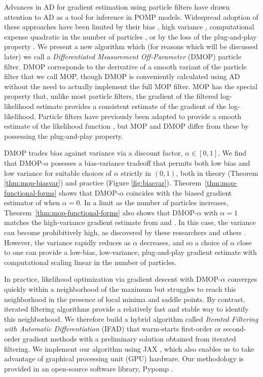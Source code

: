 \documentclass[numsec,webpdf,modern,medium,namedate]{oup-authoring-template}
\begin{document}
Advances in AD for gradient estimation using particle filters \citep{naesseth18, jonschkowski18, corenflos21, scibior21, singh22} have drawn attention to AD as a tool for inference in POMP models.
Widespread adoption of these approaches have been limited by their bias \citep{naesseth18, jonschkowski18}, high variance \citep{poyiadjis11, scibior21}, computational expense quadratic in the number of particles \citep{corenflos21, chen24}, or by the loss of the plug-and-play property \citep{poyiadjis11, scibior21, singh22, chen24}.
We present a new algorithm which (for reasons which will be discussed later) we call a {\it Differentiated Measurement Off-Parameter} (DMOP) particle filter.
DMOP corresponds to the derivative of a smooth variant of the particle filter that we call MOP, though DMOP is conveniently calculated using AD without the need to actually implement the full MOP filter.
MOP has the special property that, unlike most particle filters, the gradient of the filtered log-likelihood estimate provides a consistent estimate of the gradient of the log-likelihood.
Particle filters have previously been adapted to provide a smooth estimate of the likelihood function \citep{svensson18,malik11}, but MOP and DMOP differ from these by possessing the plug-and-play property.

DMOP trades bias against variance via a discount factor, $\alpha \in [0,1]$.
We find that DMOP-$\alpha$ posesses a bias-variance tradeoff that permits both low bias and low variance for suitable choices of $\alpha$ strictly in $(0,1)$, both in theory (Theorem \ref{thm:mop-biasvar}) and practice (Figure \ref{fig:biasvar}).
Theorem~\ref{thm:mop-functional-forms} shows that DMOP-$\alpha$ coincides with the biased gradient estimator of \cite{naesseth18} when $\alpha=0$.
In a limit as the number of particles increases, Theorem~\ref{thm:mop-functional-forms} also shows that DMOP-$\alpha$ with $\alpha=1$ matches the high-variance gradient estimate from \cite{poyiadjis11} and \cite{scibior21}.
In this case, the variance can become prohibitively high, as discovered by these researchers and others \citep{arya22}.
However, the variance rapidly reduces as $\alpha$ decreases, and so a choice of $\alpha$ close to one can provide a low-bias, low-variance, plug-and-play gradient estimate with computational scaling linear in the number of particles.

In practice, likelihood optimization via gradient descent with DMOP-$\alpha$ converges quickly within a neighborhood of the maximum but struggles to reach this neighborhood in the presence of local minima and saddle points.
By contrast, iterated filtering algorithms provide a relatively fast and stable way to identify this neighborhood.
We therefore build a hybrid algorithm called {\it Iterated Filtering with Automatic Differentiation} (IFAD) that warm-starts first-order or second-order gradient methods with a preliminary solution obtained from iterated filtering.
We implement our algorithm using JAX \citep{jax}, which also enables us to take advantage of graphical processing unit (GPU) hardware.
Our methodology is provided in an open-source software library, Pypomp \citep{abkemeier25}.
\end{document}
